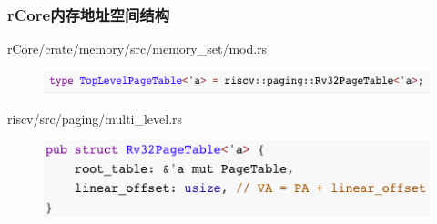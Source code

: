 \begin{frame}[fragile]
    \frametitle{rCore内存地址空间结构}
 	\begin{block}{rCore/crate/memory/src/memory\_set/mod.rs}
    \begin{figure}
    \includegraphics[width=1.0\linewidth]{figs/TopLevelPageTable.png}
    \end{figure}
 	\end{block}


 	\begin{block}{riscv/src/paging/multi\_level.rs}
    \begin{figure}
    \includegraphics[width=0.7\linewidth]{figs/Rv32PageTable.png}
    \end{figure}
 	\end{block}


\end{frame}
